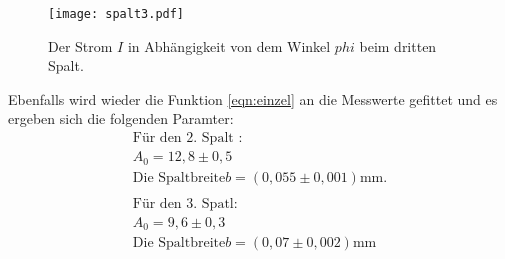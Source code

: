 \begin{figure}
  \centering
  \texttt{[image: spalt3.pdf]}
  \caption{ Der Strom $I$ in Abhängigkeit von dem Winkel $phi$ beim dritten Spalt.}
  \label{fig:spalt3}
\end{figure}

Ebenfalls wird wieder die Funktion \eqref{eqn:einzel}
an die Messwerte gefittet und es ergeben sich die folgenden Paramter:
\begin{align*}
  \text{Für den 2. Spalt :}\\
  A_0=12,8\pm0,5\\
\text{Die Spaltbreite} b=(0,055\pm0,001)\si{\milli\meter}.\\
\\
\text{Für den 3. Spatl:}\\
  A_0=9,6\pm0,3\\
  \text{Die Spaltbreite} b=(0,07\pm0,002)\si{\milli\meter}\\
\end{align*}

